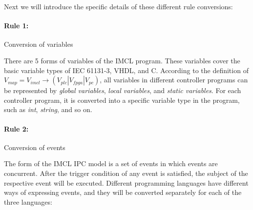 Next we will introduce the specific details of these different rule conversions:


\paragraph{\textbf{Rule 1: }} Conversion of variables

There are 5 forms of variables of the IMCL program. These variables cover the basic variable types of IEC 61131-3, VHDL, and C. According to the definition of$V_{map} = V_{imcl} \rightarrow (V_{plc} | V_{fpga}| V_{pc})$, all variables in different controller programs can be represented by \emph{global variables}, \emph{local variables}, and \emph{static variables}. For each controller program, it is converted into a specific variable type in the program, such as \emph{int}, \emph{string}, and so on.

\paragraph{\textbf{Rule 2: }} Conversion of events

The form of the IMCL IPC model is a set of events in which events are concurrent. After the trigger condition of any event is satisfied, the subject of the respective event will be executed. Different programming languages have different ways of expressing events, and they will be converted separately for each of the three languages:


